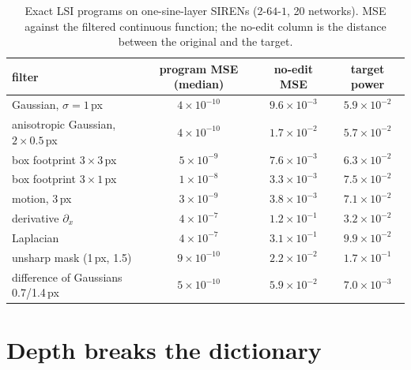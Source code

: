 \documentclass[11pt]{article}
\begin{document}
\begin{table}[t]\centering\small
\caption{Exact LSI programs on one-sine-layer SIRENs ($2$-$64$-$1$, 20 networks). MSE against the filtered continuous function; the no-edit column is the distance between the original and the target.}
\label{tab:lsi}
\begin{tabular}{lccc}\toprule
filter & program MSE (median) & no-edit MSE & target power\\\midrule
Gaussian, $\sigma=1$\,px & $4\times10^{-10}$ & $9.6\times10^{-3}$ & $5.9\times10^{-2}$\\
anisotropic Gaussian, $2\times0.5$\,px & $4\times10^{-10}$ & $1.7\times10^{-2}$ & $5.7\times10^{-2}$\\
box footprint $3\times3$\,px & $5\times10^{-9}$ & $7.6\times10^{-3}$ & $6.3\times10^{-2}$\\
box footprint $3\times1$\,px & $1\times10^{-8}$ & $3.3\times10^{-3}$ & $7.5\times10^{-2}$\\
motion, 3\,px & $3\times10^{-9}$ & $3.8\times10^{-3}$ & $7.1\times10^{-2}$\\
derivative $\partial_x$ & $4\times10^{-7}$ & $1.2\times10^{-1}$ & $3.2\times10^{-2}$\\
Laplacian & $4\times10^{-7}$ & $3.1\times10^{-1}$ & $9.9\times10^{-2}$\\
unsharp mask (1\,px, 1.5) & $9\times10^{-10}$ & $2.2\times10^{-2}$ & $1.7\times10^{-1}$\\
difference of Gaussians 0.7/1.4\,px & $5\times10^{-10}$ & $5.9\times10^{-2}$ & $7.0\times10^{-3}$\\\bottomrule
\end{tabular}
\end{table}

\section{Depth breaks the dictionary}
\label{sec:depth}
\end{document}
